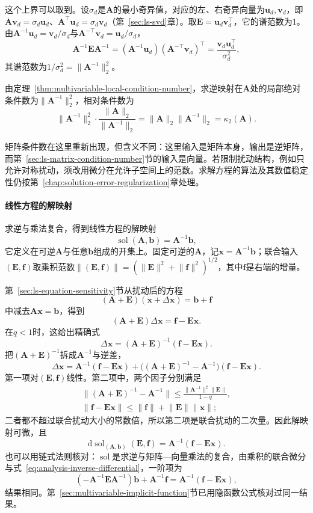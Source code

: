 这个上界可以取到。设$\sigma_d$是$\bm A$的最小奇异值，对应的左、右奇异向量为$\bm u_d,\bm v_d$，即$\bm A\bm v_d=\sigma_d\bm u_d$、$\bm A^\top\bm u_d=\sigma_d\bm v_d$（第~\ref{sec:ls-svd}章）。取$\bm E=\bm u_d\bm v_d^\top$，它的谱范数为$1$。由$\bm A^{-1}\bm u_d=\bm v_d/\sigma_d$与$\bm A^{-\top}\bm v_d=\bm u_d/\sigma_d$，
\[
 \bm A^{-1}\bm E\bm A^{-1}=(\bm A^{-1}\bm u_d)(\bm A^{-\top}\bm v_d)^\top=\frac{\bm v_d\bm u_d^\top}{\sigma_d^2},
\]
其谱范数为$1/\sigma_d^2=\lVert\bm A^{-1}\rVert_2^2$。

由定理~\ref{thm:multivariable-local-condition-number}，求逆映射在$\bm A$处的局部绝对条件数为$\lVert\bm A^{-1}\rVert_2^2$，相对条件数为
\[
 \lVert\bm A^{-1}\rVert_2^2\cdot\frac{\lVert\bm A\rVert_2}{\lVert\bm A^{-1}\rVert_2}=\lVert\bm A\rVert_2\lVert\bm A^{-1}\rVert_2=\kappa_2(\bm A).
\]

矩阵条件数在这里重新出现，但含义不同：这里输入是矩阵本身，输出是逆矩阵，而第~\ref{sec:ls-matrix-condition-number}节的输入是向量。若限制扰动结构，例如只允许对称扰动，须改用微分在允许子空间上的范数。求解方程的算法及其数值稳定性仍按第~\ref{chap:solution-error-regularization}章处理。

\paragraph{线性方程的解映射}
求逆与乘法复合，得到线性方程的解映射
\[
 \operatorname{sol}(\bm A,\bm b)=\bm A^{-1}\bm b ,
\]
它定义在可逆$\bm A$与任意$\bm b$组成的开集上。固定可逆的$\bm A$，记$\bm x=\bm A^{-1}\bm b$；联合输入$(\bm E,\bm f)$取乘积范数$\lVert(\bm E,\bm f)\rVert=(\lVert\bm E\rVert^2+\lVert\bm f\rVert^2)^{1/2}$，其中$\bm f$是右端的增量。

第~\ref{sec:ls-equation-sensitivity}节从扰动后的方程
\[
 (\bm A+\bm E)(\bm x+\Delta\bm x)=\bm b+\bm f
\]
中减去$\bm A\bm x=\bm b$，得到
\[
 (\bm A+\bm E)\Delta\bm x=\bm f-\bm E\bm x .
\]
在$q<1$时，这给出精确式
\[
 \Delta\bm x=(\bm A+\bm E)^{-1}(\bm f-\bm E\bm x).
\]
把$(\bm A+\bm E)^{-1}$拆成$\bm A^{-1}$与逆差，
\[
 \Delta\bm x=\bm A^{-1}(\bm f-\bm E\bm x)+\bigl((\bm A+\bm E)^{-1}-\bm A^{-1}\bigr)(\bm f-\bm E\bm x).
\]
第一项对$(\bm E,\bm f)$线性。第二项中，两个因子分别满足
\[
 \begin{gathered}
 \bigl\lVert(\bm A+\bm E)^{-1}-\bm A^{-1}\bigr\rVert\leq\frac{\lVert\bm A^{-1}\rVert^2\lVert\bm E\rVert}{1-q},\\
 \lVert\bm f-\bm E\bm x\rVert\leq\lVert\bm f\rVert+\lVert\bm E\rVert\lVert\bm x\rVert ;
 \end{gathered}
\]
二者都不超过联合扰动大小的常数倍，所以第二项是联合扰动的二次量。因此解映射可微，且
\begin{equation}
 \mathrm d\operatorname{sol}_{(\bm A,\bm b)}(\bm E,\bm f)=\bm A^{-1}(\bm f-\bm E\bm x).
\label{eq:multivariable-solution-map-differential}
\end{equation}
也可以用链式法则核对：$\operatorname{sol}$是求逆与矩阵—向量乘法的复合，由乘积的联合微分与式~\eqref{eq:analysis-inverse-differential}，一阶项为
\[
 (-\bm A^{-1}\bm E\bm A^{-1})\bm b+\bm A^{-1}\bm f=\bm A^{-1}(\bm f-\bm E\bm x),
\]
结果相同。第~\ref{sec:multivariable-implicit-function}节已用隐函数公式核对过同一结果。

